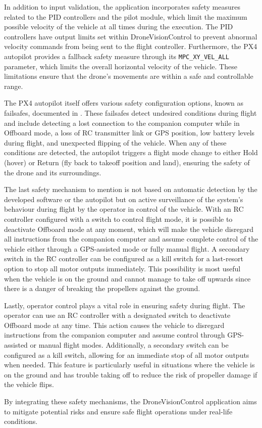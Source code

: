 In addition to input validation, the application incorporates safety measures related to the PID controllers and the pilot module, which limit the maximum possible velocity of the vehicle at all times during the execution. The PID controllers have output limits set within DroneVisionControl to prevent abnormal velocity commands from being sent to the flight controller. Furthermore, the PX4 autopilot provides a fallback safety measure through its \texttt{MPC\_XY\_VEL\_ALL} parameter, which limits the overall horizontal velocity of the vehicle. These limitations ensure that the drone's movements are within a safe and controllable range.

The PX4 autopilot itself offers various safety configuration options, known as failsafes, documented in  \cite{px4-docs-safety}. These failsafes detect undesired conditions during flight and include detecting a lost connection to the companion computer while in Offboard mode, a loss of RC transmitter link or GPS position, low battery levels during flight, and unexpected flipping of the vehicle. When any of these conditions are detected, the autopilot triggers a flight mode change to either Hold (hover) or Return (fly back to takeoff position and land), ensuring the safety of the drone and its surroundings.

The last safety mechanism to mention is not based on automatic detection by the developed software or the autopilot but on active surveillance of the system's behaviour during flight by the operator in control of the vehicle.
With an RC controller configured with a switch to control flight mode, it is possible to deactivate Offboard mode at any moment, which will make the vehicle disregard all instructions from the companion computer and assume complete control of the vehicle either through a GPS-assisted mode or fully manual flight.
A secondary switch in the RC controller can be configured as a kill switch for a last-resort option to stop all motor outputs immediately.
This possibility is most useful when the vehicle is on the ground and cannot manage to take off upwards since there is a danger of breaking the propellers against the ground.

Lastly, operator control plays a vital role in ensuring safety during flight. The operator can use an RC controller with a designated switch to deactivate Offboard mode at any time. This action causes the vehicle to disregard instructions from the companion computer and assume control through GPS-assisted or manual flight modes. Additionally, a secondary switch can be configured as a kill switch, allowing for an immediate stop of all motor outputs when needed. This feature is particularly useful in situations where the vehicle is on the ground and has trouble taking off to reduce the risk of propeller damage if the vehicle flips.

By integrating these safety mechanisms, the DroneVisionControl application aims to mitigate potential risks and ensure safe flight operations under real-life conditions.